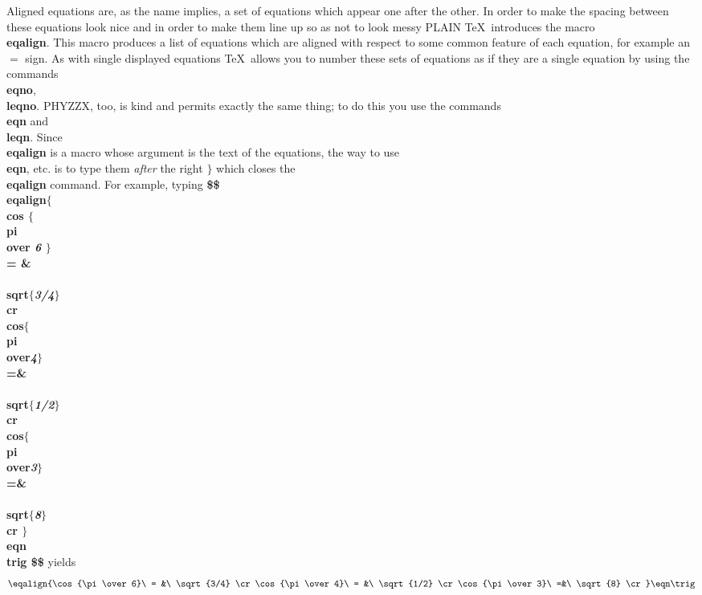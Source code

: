 Aligned equations are, as the name implies, a set of equations
which appear one after the other.
In order to make the spacing between these equations look nice
and in order to make them line up so as not to look messy
PLAIN \TeX\ introduces the macro {\bf \\eqalign}.
This macro produces a list of equations which are aligned with
respect to some common feature of each equation, for example
an $=$ sign.
As with single displayed equations \TeX\ allows you to number these
sets of equations as if they are a single equation by using the
commands {\bf \\eqno}, {\bf \\leqno}.
PHYZZX, too, is kind and permits exactly the same thing; to do this you
use the commands {\bf \\eqn} and {\bf \\leqn}.
Since {\bf \\eqalign} is a macro whose argument is the text of the
equations, the way to use {\bf \\eqn}, etc. is to type them
{\it after} the right $\}$ which closes the {\bf \\eqalign}    %
command.
For example, typing \nextline
{\bf \$\$ \\eqalign$\{$ \\cos $\{$ \\pi \\over {\it 6} $\}$\\ = \& \\
\\sqrt$\{${\it 3/4}$\}$ \\cr \nextline
\\cos$\{$\\pi\\over{\it 4}$\}$\\ =\&\\ \\sqrt$\{${\it 1/2}$\}$ \\cr
\nextline
\\cos$\{$\\pi\\over{\it 3}$\}$\\ =\&\\ \\sqrt$\{${\it 8}$\}$ \\cr $\}$
\\eqn\\trig \$\$ }\nextline
yields
$$ \eqalign{\cos{\pi \over 6}\ = &\ \sqrt{3/4} \cr
\cos{\pi\over 4}\ = &\ \sqrt{1/2} \cr
\cos{\pi \over 3}\ =&\ \sqrt{8} \cr} \eqn\trig $$
 
